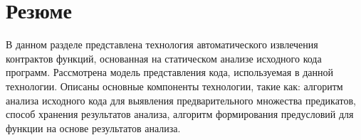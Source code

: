 \section{Резюме}
В данном разделе представлена технология автоматического извлечения контрактов функций, основанная на статическом анализе исходного кода программ. Рассмотрена модель представления кода, используемая в данной технологии. Описаны основные компоненты технологии, такие как: алгоритм анализа исходного кода для выявления предварительного множества предикатов, способ хранения результатов анализа, алгоритм формирования предусловий для функции на основе результатов анализа.